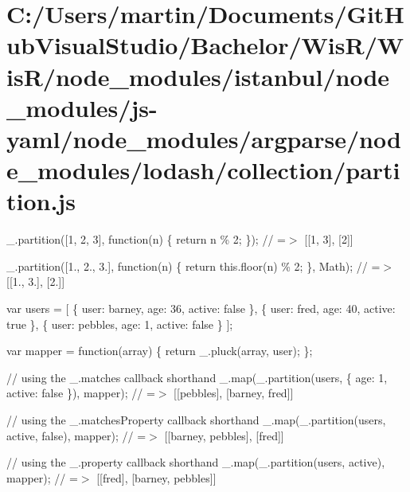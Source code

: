 \hypertarget{_c_1_2_users_2martin_2_documents_2_git_hub_visual_studio_2_bachelor_2_wis_r_2_wis_r_2node_module1a3cfabad9707155e4efdc7c8dac9c48}{}\section{C\+:/\+Users/martin/\+Documents/\+Git\+Hub\+Visual\+Studio/\+Bachelor/\+Wis\+R/\+Wis\+R/node\+\_\+modules/istanbul/node\+\_\+modules/js-\/yaml/node\+\_\+modules/argparse/node\+\_\+modules/lodash/collection/partition.\+js}
\+\_\+.\+partition(\mbox{[}1, 2, 3\mbox{]}, function(n) \{ return n \% 2; \}); // =$>$ \mbox{[}\mbox{[}1, 3\mbox{]}, \mbox{[}2\mbox{]}\mbox{]}

\+\_\+.\+partition(\mbox{[}1., 2., 3.\mbox{]}, function(n) \{ return this.\+floor(n) \% 2; \}, Math); // =$>$ \mbox{[}\mbox{[}1., 3.\mbox{]}, \mbox{[}2.\mbox{]}\mbox{]}

var users = \mbox{[} \{ \textquotesingle{}user\textquotesingle{}\+: \textquotesingle{}barney\textquotesingle{}, \textquotesingle{}age\textquotesingle{}\+: 36, \textquotesingle{}active\textquotesingle{}\+: false \}, \{ \textquotesingle{}user\textquotesingle{}\+: \textquotesingle{}fred\textquotesingle{}, \textquotesingle{}age\textquotesingle{}\+: 40, \textquotesingle{}active\textquotesingle{}\+: true \}, \{ \textquotesingle{}user\textquotesingle{}\+: \textquotesingle{}pebbles\textquotesingle{}, \textquotesingle{}age\textquotesingle{}\+: 1, \textquotesingle{}active\textquotesingle{}\+: false \} \mbox{]};

var mapper = function(array) \{ return \+\_\+.\+pluck(array, \textquotesingle{}user\textquotesingle{}); \};

// using the {\ttfamily \+\_\+.\+matches} callback shorthand \+\_\+.\+map(\+\_\+.\+partition(users, \{ \textquotesingle{}age\textquotesingle{}\+: 1, \textquotesingle{}active\textquotesingle{}\+: false \}), mapper); // =$>$ \mbox{[}\mbox{[}\textquotesingle{}pebbles\textquotesingle{}\mbox{]}, \mbox{[}\textquotesingle{}barney\textquotesingle{}, \textquotesingle{}fred\textquotesingle{}\mbox{]}\mbox{]}

// using the {\ttfamily \+\_\+.\+matches\+Property} callback shorthand \+\_\+.\+map(\+\_\+.\+partition(users, \textquotesingle{}active\textquotesingle{}, false), mapper); // =$>$ \mbox{[}\mbox{[}\textquotesingle{}barney\textquotesingle{}, \textquotesingle{}pebbles\textquotesingle{}\mbox{]}, \mbox{[}\textquotesingle{}fred\textquotesingle{}\mbox{]}\mbox{]}

// using the {\ttfamily \+\_\+.\+property} callback shorthand \+\_\+.\+map(\+\_\+.\+partition(users, \textquotesingle{}active\textquotesingle{}), mapper); // =$>$ \mbox{[}\mbox{[}\textquotesingle{}fred\textquotesingle{}\mbox{]}, \mbox{[}\textquotesingle{}barney\textquotesingle{}, \textquotesingle{}pebbles\textquotesingle{}\mbox{]}\mbox{]}


